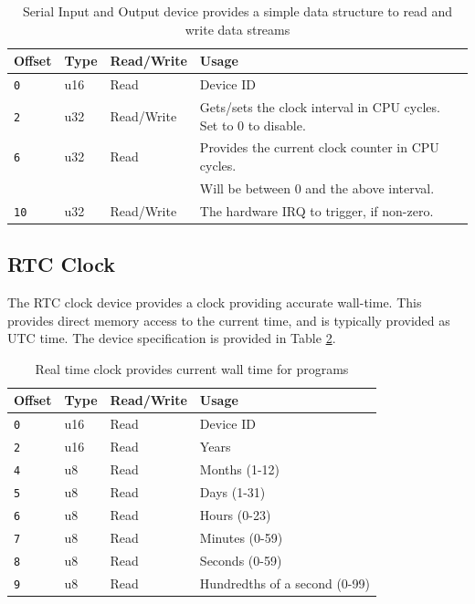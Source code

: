 \documentclass{article}
\begin{document}
\begin{table}[h!]
	\centering
	\begin{tabular}{l|lll}
		\hline
		Offset & Type & Read/Write & Usage \\
		\hline
		\texttt{0} & u16 & Read & Device ID \\
		\texttt{2} & u32 & Read/Write & Gets/sets the clock interval in CPU cycles. Set to 0 to disable. \\
		\texttt{6} & u32 & Read & Provides the current clock counter in CPU cycles. \\
		{} & {} & {} & Will be between 0 and the above interval. \\
		\texttt{10} & u32 & Read/Write & The hardware IRQ to trigger, if non-zero. \\
		\hline
	\end{tabular}
	\caption{Serial Input and Output device provides a simple data structure to read and write data streams}
	\label{table:dev-irq-clock}
\end{table}

\subsection{RTC Clock}
\label{sec:dev-rtc-clock}

The RTC clock device provides a clock providing accurate wall-time. This provides direct memory access to the current time, and is typically provided as UTC time. The device specification is provided in Table \ref{table:dev-rtc-clock}.

\begin{table}[h!]
	\centering
	\begin{tabular}{l|lll}
		\hline
		Offset & Type & Read/Write & Usage \\
		\hline
		\texttt{0} & u16 & Read & Device ID \\
		\texttt{2} & u16 & Read & Years \\
		\texttt{4} & u8 & Read & Months (1-12) \\
		\texttt{5} & u8 & Read & Days (1-31) \\
		\texttt{6} & u8 & Read & Hours (0-23) \\
		\texttt{7} & u8 & Read & Minutes (0-59) \\
		\texttt{8} & u8 & Read & Seconds (0-59) \\
		\texttt{9} & u8 & Read & Hundredths of a second (0-99) \\
		\hline
	\end{tabular}
	\caption{Real time clock provides current wall time for programs}
	\label{table:dev-rtc-clock}
\end{table}
\end{document}
